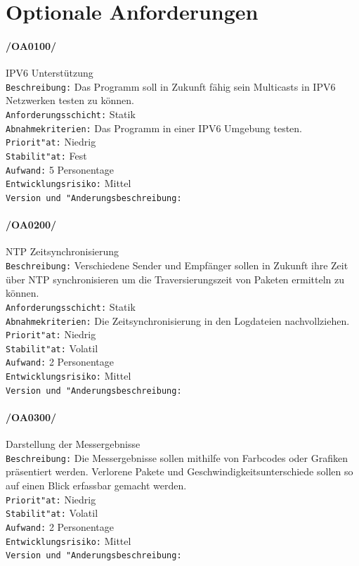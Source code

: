 \section{Optionale Anforderungen}
\label{sec:optional}


\paragraph{/OA0100/} IPV6 Unterstützung\\
\texttt{Beschreibung:} Das Programm soll in Zukunft fähig sein Multicasts in
IPV6 Netzwerken testen zu können.\\
\texttt{Anforderungsschicht:} Statik\\ 
\texttt{Abnahmekriterien:} Das Programm in einer IPV6 Umgebung testen.\\
\texttt{Priorit"at:} Niedrig\\
\texttt{Stabilit"at:} Fest\\
\texttt{Aufwand:} 5 Personentage\\
\texttt{Entwicklungsrisiko:} Mittel\\
\texttt{Version und "Anderungsbeschreibung:}\newline

\paragraph{/OA0200/} NTP Zeitsynchronisierung\\
\texttt{Beschreibung:} Verschiedene Sender und Empfänger sollen in Zukunft
ihre Zeit über NTP synchronisieren um die Traversierungszeit von Paketen
ermitteln zu können.\\ \texttt{Anforderungsschicht:} Statik\\ 
\texttt{Abnahmekriterien:} Die Zeitsynchronisierung in den Logdateien
nachvollziehen.\\ 
\texttt{Priorit"at:} Niedrig\\
\texttt{Stabilit"at:} Volatil\\
\texttt{Aufwand:} 2 Personentage\\
\texttt{Entwicklungsrisiko:} Mittel\\
\texttt{Version und "Anderungsbeschreibung:}

\paragraph{/OA0300/} Darstellung der Messergebnisse\\
\texttt{Beschreibung:} Die Messergebnisse sollen mithilfe von Farbcodes oder
Grafiken präsentiert werden. Verlorene Pakete und Geschwindigkeitsunterschiede
sollen so auf einen Blick erfassbar gemacht werden.\\
\texttt{Priorit"at:} Niedrig\\
\texttt{Stabilit"at:} Volatil\\
\texttt{Aufwand:} 2 Personentage\\
\texttt{Entwicklungsrisiko:} Mittel\\
\texttt{Version und "Anderungsbeschreibung:}

